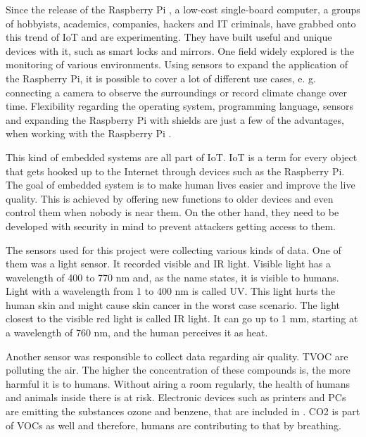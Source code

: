\documentclass{article}      %
\begin{document}
Since the release of the Raspberry Pi \cite{raspberry}, a low-cost single-board computer, a groups of hobbyists, academics, companies, hackers and \acrshort{IT} criminals, have grabbed onto this trend of \acrfull{IoT} and are experimenting. They have built useful and unique devices with it, such as smart locks and mirrors. One field widely explored is the monitoring of various environments. Using sensors to expand the application of the Raspberry Pi, it is possible to cover a lot of different use cases, e. g. connecting a camera to observe the surroundings or record climate change over time. Flexibility regarding the operating system, programming language, sensors and expanding the Raspberry Pi with shields are just a few of the advantages, when working with the Raspberry Pi \cite{rasberry}. 

This kind of embedded systems are all part of \gls{IoT}. \gls{IoT} is a term for every object that gets hooked up to the Internet through devices such as the Raspberry Pi. The goal of embedded system is to make human lives easier and improve the live quality. This is achieved by offering new functions to older devices and even control them when nobody is near them. On the other hand, they need to be developed with security in mind to prevent attackers getting access to them. \cite{iot}

The sensors used for this project were collecting various kinds of data. One of them was a light sensor. It recorded visible and \gls{IR} light. Visible light has a wavelength of 400 to 770 \gls{nm} and, as the name states, it is visible to humans. Light with a  wavelength from 1 to 400 \gls{nm} is called \gls{UV}. This light hurts the human skin and might cause skin cancer in the worst case scenario. The light closest to the visible red light is called \gls{IR} light. It can go up to 1 \gls{mm}, starting at a wavelength of 760 \gls{nm}, and the human perceives it as heat. \cite{lightDesc}

Another sensor was responsible to collect data regarding air quality. \Gls{TVOC} are polluting the air. The higher the concentration of these compounds is, the more harmful it is to humans. Without airing a room regularly, the health of humans and animals inside there is at risk. Electronic devices such as printers and \glspl{PC} are emitting the substances ozone and benzene, that are included in . \Gls{CO2} is part of \glspl{VOC} as well and therefore, humans are contributing to that by breathing.
\cite{airQualitySensor}
\end{document}
